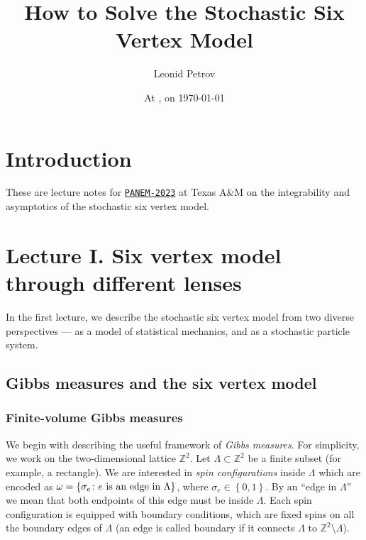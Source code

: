 \documentclass[letterpaper,11pt,oneside,reqno]{article}
\numberwithin{equation}{section}
\theoremstyle{definition}
\theoremstyle{remark}
\begin{document}
\title{How to Solve the Stochastic Six Vertex Model}


\author{Leonid Petrov}

\date{At \currenttime{}, on \today}

\setcounter{tocdepth}{4}

\maketitle


\section*{Introduction}

These are lecture notes for \href{https://www.math.tamu.edu/conferences/functional_analysis/PANEM.html}{\texttt{PANEM-2023}} at Texas A{}\&M on the integrability and asymptotics of the stochastic six vertex model.



\newpage
\section{Lecture I. Six vertex model through different lenses}
\label{sec:6v_model_lecture}

In the first lecture, we describe the stochastic six vertex model
from two diverse perspectives --- as a model of statistical mechanics,
and as a stochastic particle system.

\subsection{Gibbs measures and the six vertex model}
\label{sub:gibbs_6v}

\subsubsection{Finite-volume Gibbs measures}

We begin with describing the useful framework of \emph{Gibbs measures}.
For simplicity, we work on the two-dimensional lattice $\mathbb{Z}^2$.
Let $\Lambda\subset\mathbb{Z}^{2}$ be a finite subset (for example, a rectangle).
We are interested in \emph{spin configurations} inside $\Lambda$
which are encoded as $\omega=\{\sigma_e\colon e \textnormal{ is an edge in $\Lambda$}\}$,
where $\sigma_e\in\left\{ 0,1 \right\}$.
By an ``edge in $\Lambda$'' we mean that both endpoints of this edge must be inside $\Lambda$.
Each spin configuration is equipped with boundary conditions,
which are fixed spins on all the boundary edges of $\Lambda$
(an edge is called boundary if it connects $\Lambda$ to $\mathbb{Z}^{2}\setminus \Lambda$).
\end{document}
